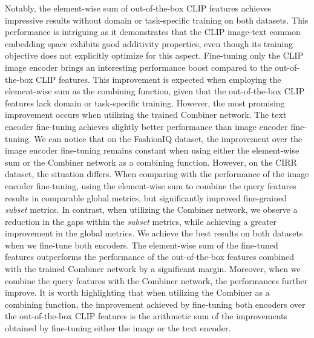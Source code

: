 \documentclass[acmlarge]{acmart}
\begin{document}
Notably, the element-wise sum of out-of-the-box CLIP features achieves impressive results without domain or task-specific training on both datasets. This performance is intriguing as it demonstrates that the CLIP image-text common embedding space exhibits good additivity properties, even though its training objective does not explicitly optimize for this aspect.
Fine-tuning only the CLIP image encoder brings an interesting performance boost compared to the out-of-the-box CLIP features. This improvement is expected when employing the element-wise sum as the combining function, given that the out-of-the-box CLIP features lack domain or task-specific training. However, the most promising improvement occurs when utilizing the trained Combiner network.
The text encoder fine-tuning achieves slightly better performance than image encoder fine-tuning. We can notice that on the FashionIQ dataset, the improvement over the image encoder fine-tuning remains constant when using either the element-wise sum or the Combiner network as a combining function. 
However, on the CIRR dataset, the situation differs. When comparing with the performance of the image encoder fine-tuning, using the element-wise sum to combine the query features results in comparable global metrics, but significantly improved fine-grained \textit{subset} metrics. In contrast, when utilizing the Combiner network, we observe a reduction in the gaps within the \textit{subset} metrics, while achieving a greater improvement in the global metrics.
We achieve the best results on both datasets when we fine-tune both encoders. The element-wise sum of the fine-tuned features outperforms the performance of the out-of-the-box features combined with the trained Combiner network by a significant margin. Moreover, when we combine the query features with the Combiner network, the performances further improve. It is worth highlighting that when utilizing the Combiner as a combining function, the improvement achieved by fine-tuning both encoders over the out-of-the-box CLIP features is the arithmetic sum of the improvements obtained by fine-tuning either the image or the text encoder.
\end{document}
